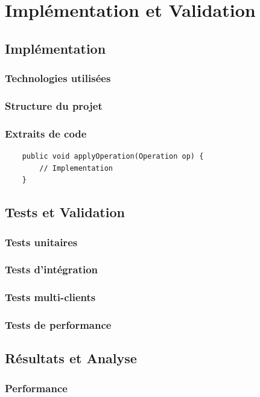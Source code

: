 \documentclass[a4paper,oneside,12pt]{book}
\begin{document}
\part{Implémentation et Validation}

\chapter{Implémentation}
\section{Technologies utilisées}
\section{Structure du projet}
\section{Extraits de code}

\begin{lstlisting}
	public void applyOperation(Operation op) {
		// Implementation
	}
\end{lstlisting}

\chapter{Tests et Validation}
\section{Tests unitaires}
\section{Tests d’intégration}
\section{Tests multi-clients}
\section{Tests de performance}

\chapter{Résultats et Analyse}
\section{Performance}
\end{document}

